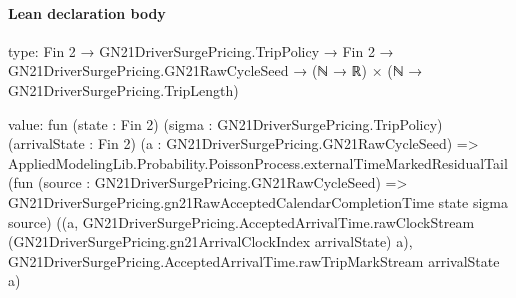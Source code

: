 \documentclass[10pt]{article}
\begin{document}
\paragraph{Lean declaration body}
\begin{ReviewVerbatim}
type:
Fin 2 →
  GN21DriverSurgePricing.TripPolicy →
    Fin 2 → GN21DriverSurgePricing.GN21RawCycleSeed → (ℕ → ℝ) × (ℕ → GN21DriverSurgePricing.TripLength)

value:
fun (state : Fin 2) (sigma : GN21DriverSurgePricing.TripPolicy) (arrivalState : Fin 2)
    (a : GN21DriverSurgePricing.GN21RawCycleSeed) =>
  AppliedModelingLib.Probability.PoissonProcess.externalTimeMarkedResidualTail
    (fun (source : GN21DriverSurgePricing.GN21RawCycleSeed) =>
      GN21DriverSurgePricing.gn21RawAcceptedCalendarCompletionTime state sigma source)
    ((a,
        GN21DriverSurgePricing.AcceptedArrivalTime.rawClockStream
          (GN21DriverSurgePricing.gn21ArrivalClockIndex arrivalState) a),
      GN21DriverSurgePricing.AcceptedArrivalTime.rawTripMarkStream arrivalState a)
\end{ReviewVerbatim}
\end{document}
